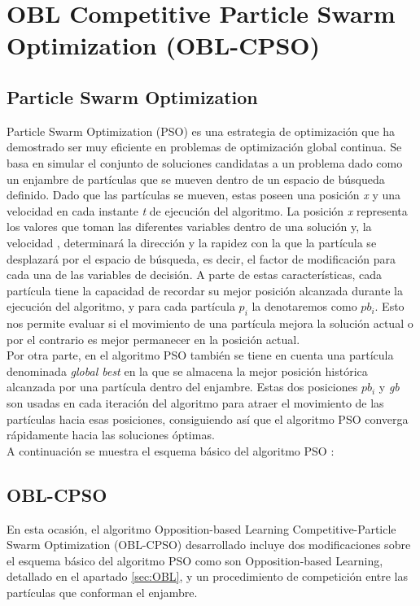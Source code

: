 


\section{OBL Competitive Particle Swarm Optimization (OBL-CPSO)}
\label{sec:OBL-CPSO}

\subsection{Particle Swarm Optimization}
Particle Swarm Optimization (PSO) \cite{metabook, comparison, PSO_KA, GPSO} es una estrategia de optimización que ha demostrado ser muy eficiente en problemas de optimización global continua. Se basa en simular el conjunto de soluciones candidatas a un problema dado como un enjambre de partículas que se mueven dentro de un espacio de búsqueda definido. Dado que las partículas se mueven, estas poseen una posición \textit{x} y una velocidad  en cada instante \textit{t} de ejecución del algoritmo. La posición \textit{x} representa los valores que toman las diferentes variables dentro de una solución y, la velocidad , determinará la dirección y la rapidez con la que la partícula se desplazará por el espacio de búsqueda, es decir, el factor de modificación para cada una de las variables de decisión. A parte de estas características, cada partícula tiene la capacidad de recordar su mejor posición alcanzada durante la ejecución del algoritmo, y para cada partícula $p_{i}$ la denotaremos como $pb_{i}$\cite{metabook}. Esto nos permite evaluar si el movimiento de una partícula mejora la solución actual o por el contrario es mejor permanecer en la posición actual. \\

Por otra parte, en el algoritmo PSO también se tiene en cuenta una partícula denominada \textit{global best} en la que se almacena la mejor posición histórica alcanzada por una partícula dentro del enjambre. Estas dos posiciones $pb_{i}$ y \textit{gb} son usadas en cada iteración del algoritmo para atraer el movimiento de las partículas hacia esas posiciones, consiguiendo así que el algoritmo PSO converga rápidamente hacia las soluciones óptimas. \\
A continuación se muestra el esquema básico del algoritmo PSO \cite{metabook}: 


\subsection{OBL-CPSO}
En esta ocasión, el algoritmo Opposition-based Learning Competitive-Particle Swarm Optimization (OBL-CPSO) \cite{oblcpso} desarrollado incluye dos modificaciones sobre el esquema básico del algoritmo PSO como son Opposition-based Learning, detallado en el apartado \ref{sec:OBL}, y un procedimiento de competición entre las partículas que conforman el enjambre. \\

